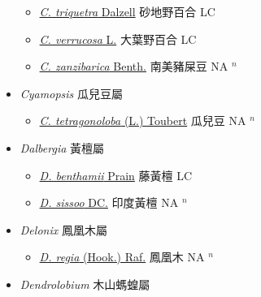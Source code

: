 \begin{itemize}
\begin{itemize}
        \item[] \href{http://www.theplantlist.org/tpl1.1/search?q=Crotalaria+triquetra}{\textit{C. triquetra} Dalzell}   砂地野百合 LC
        \item[] \href{http://www.theplantlist.org/tpl1.1/search?q=Crotalaria+verrucosa}{\textit{C. verrucosa} L.}   大葉野百合 LC
        \item[] \href{http://www.theplantlist.org/tpl1.1/search?q=Crotalaria+zanzibarica}{\textit{C. zanzibarica} Benth.}   南美豬屎豆 NA $^n$
  \end{itemize}
 \item[] \textit{Cyamopsis} 瓜兒豆屬
                    
  \begin{itemize}
        \item[] \href{http://www.theplantlist.org/tpl1.1/search?q=Cyamopsis+tetragonoloba}{\textit{C. tetragonoloba} (L.) Toubert}   瓜兒豆 NA $^n$
  \end{itemize}
 \item[] \textit{Dalbergia} 黃檀屬
                    
  \begin{itemize}
        \item[] \href{http://www.theplantlist.org/tpl1.1/search?q=Dalbergia+benthamii}{\textit{D. benthamii} Prain}   藤黃檀 LC
        \item[] \href{http://www.theplantlist.org/tpl1.1/search?q=Dalbergia+sissoo}{\textit{D. sissoo} DC.}   印度黃檀 NA $^n$
  \end{itemize}
 \item[] \textit{Delonix} 鳳凰木屬
                    
  \begin{itemize}
        \item[] \href{http://www.theplantlist.org/tpl1.1/search?q=Delonix+regia}{\textit{D. regia} (Hook.) Raf.}   鳳凰木 NA $^n$
  \end{itemize}
 \item[] \textit{Dendrolobium} 木山螞蝗屬
                    

\end{itemize}
